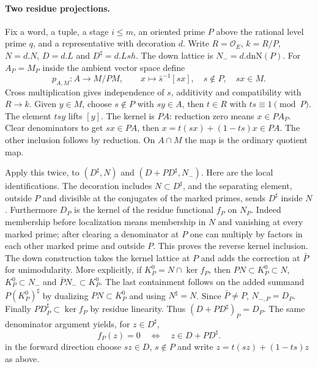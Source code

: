 \paragraph{Two residue projections.}
Fix a word, a tuple, a stage $i\le m$, an oriented prime $P$ above
the rational level prime $q$, and a representative with decoration $d$.
Write $R=\mathcal O_E$, $k=R/P$, $N=d.N$, $D=d.L$ and $D^\sharp=d.Lsh$.
The down lattice is $N_-=d.\mathrm{dnN}(P)$.
For $A_P=M_P$ inside the ambient vector space define
\[
 p_{A,M}:A\longrightarrow M/PM,\qquad
 x\longmapsto \bar s^{-1}[sx],\quad s\notin P,\quad sx\in M.
\]
Cross multiplication gives independence of $s$, additivity and
compatibility with $R\to k$. Given $y\in M$, choose $s\notin P$ with
$sy\in A$, then $t\in R$ with $ts\equiv1\pmod P$. The element $tsy$
lifts $[y]$. The kernel is $PA$: reduction zero means $x\in P A_P$.
Clear denominators to get $sx\in PA$, then
$x=t(sx)+(1-ts)x\in PA$. The other inclusion follows by reduction.
On $A\cap M$ the map is the ordinary quotient map.

Apply this twice, to $(D^\sharp,N)$ and $(D+PD^\sharp,N_-)$.
Here are the local identifications. The decoration includes $N\subset
D^\sharp$, and the separating element, outside $P$ and divisible at
the conjugates of the marked primes, sends $D^\sharp$ inside $N$.
Furthermore $D_P$ is the kernel of the residue functional $f_P$ on
$N_P$. Indeed membership before localization means membership in $N$
and vanishing at every marked prime; after clearing a denominator at
$P$ one can multiply by factors in each other marked prime and outside
$P$. This proves the reverse kernel inclusion. The down construction
takes the kernel lattice at $P$ and adds the correction at $\bar P$ for
unimodularity. More explicitly, if $K_P^0=N\cap\ker f_P$, then
$PN\subset K_P^0\subset N$, $K_P^0\subset N_-$ and
$\bar P N_-\subset K_P^0$. The last containment follows on the added
summand $P(K_P^0)^\sharp$ by dualizing $PN\subset K_P^0$ and using
$N^\sharp=N$. Since $\bar P\ne P$, $N_{-,P}=D_P$.
Finally $PD_P^\sharp\subset\ker f_P$ by residue linearity. Thus
$(D+PD^\sharp)_P=D_P$. The same denominator argument yields, for
$z\in D^\sharp$,
\[
           f_P(z)=0\quad\Longleftrightarrow\quad z\in D+PD^\sharp .
\]
in the forward direction choose $sz\in D$, $s\notin P$ and write
$z=t(sz)+(1-ts)z$ as above.

